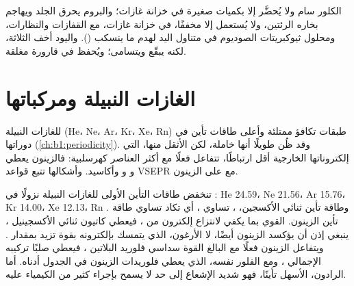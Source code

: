 \begin{inthelab}
الكلور سام ولا يُحضَّر إلا بكميات صغيرة في خزانة
غازات؛ والبروم يحرق الجلد ويهاجم بخاره الرئتين، ولا
يُستعمل إلا مخففًا، في خزانة غازات، مع القفازات والنظارات، ومحلول ثيوكبريتات
الصوديوم في متناول اليد لهدم ما ينسكب
(). واليود أخف
الثلاثة، لكنه يبقّع ويتسامى؛ ويُحفظ في قارورة مغلقة.
\end{inthelab}

\section{الغازات النبيلة ومركباتها}

للغازات النبيلة (He، Ne، Ar، Kr، Xe، Rn) طبقات تكافؤ ممتلئة
وأعلى طاقات تأين في دوراتها (\cref{ch:b1:periodicity}).
وقد ظُن طويلًا أنها خاملة، لكن الأثقل منها، التي إلكتروناتها الخارجية أقل
ارتباطًا، تتفاعل فعلًا مع أكثر العناصر كهرسلبية: فالزينون يعطي
 و و وأكاسيد. وأشكالها تتبع قواعد VSEPR
مع  على الزينون.

\begin{example}
تنخفض طاقات التأين الأولى للغازات النبيلة نزولًا في : He
24.59، Ne 21.56، Ar 15.76، Kr 14.00، Xe 12.13، Rn . وطاقة تأين
ثنائي الأكسجين، ، تساوي ، أي تكاد تساوي طاقة تأين الزينون. 
القوي بما يكفي لانتزاع إلكترون من ، فيعطي
كاتيون ثنائي الأكسجينيل ، ينبغي إذن أن يؤكسد الزينون أيضًا، لا
الأرغون، الذي يتمسك بإلكترونه بقوة تزيد بمقدار . ويتفاعل الزينون فعلًا
مع  البالغ القوة سداسي فلوريد البلاتين ، فيعطي صلبًا
تركيبه الإجمالي ، ومع الفلور نفسه، الذي يعطي
فلوريدات الزينون في الجدول أدناه. أما الرادون، الأسهل تأينًا، فهو
شديد الإشعاع إلى حد لا يسمح بإجراء كثير من الكيمياء عليه.
\end{example}

